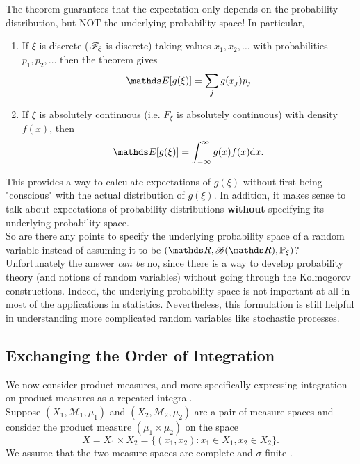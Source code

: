 \begin{remark} The theorem guarantees that the expectation only depends on the probability distribution, but NOT the underlying probability space! In particular,
\begin{enumerate}
    \item If $\xi$ is discrete ($\mathcal{F}_\xi$ is discrete) taking values $x_1, x_2, \dots$ with probabilities $p_1, p_2, \dots$ then the theorem gives 
    \begin{equation}
        \E [g(\xi)] = \sum_{j} g(x_j) p_j
    \end{equation}
    \item If $\xi$ is absolutely continuous (i.e. $F_\xi$ is absolutely continuous) with density $f(x)$, then 
    \begin{equation}
        \E [g(\xi)] = \int_{-\infty}^\infty g(x)f(x)\d x.
    \end{equation}
\end{enumerate}
This provides a way to calculate expectations of $g(\xi)$ without first being "conscious" with the actual distribution of $g(\xi)$. In addition, it makes sense to talk about expectations of probability distributions \textbf{without} specifying its underlying probability space.\\

So are there any points to specify the underlying probability space of a random variable instead of assuming it to be $(\R, \B(\R), \p_\xi)$? Unfortunately the answer \textit{can be} no, since there is a way to develop probability theory (and notions of random variables) without going through the Kolmogorov constructions. Indeed, the underlying probability space is not important at all in most of the applications in statistics. Nevertheless, this formulation is still helpful in understanding more complicated random variables like stochastic processes.
\end{remark}

\subsection{Exchanging the Order of Integration}

We now consider product measures, and more specifically expressing integration on product measures as a repeated integral.\\

Suppose $(X_1, \mathcal{M}_1, \mu_1)$ and $(X_2,  \mathcal{M}_2, \mu_2)$ are a pair of measure spaces and consider the product measure $(\mu_1 \times \mu_2)$ on the space 
\begin{equation}
	X = X_1 \times X_2 = \{ (x_1, x_2): x_1 \in X_1, x_2 \in X_2 \}.
\end{equation}
We assume that the two measure spaces are complete  and $\sigma$-finite .\\

